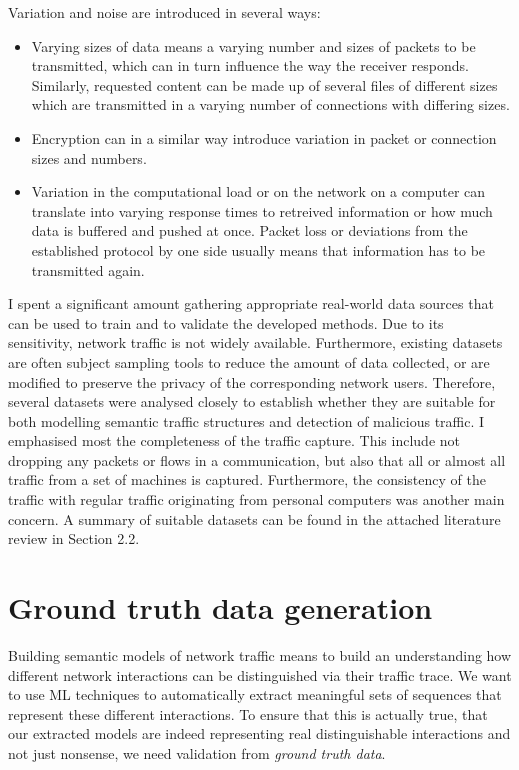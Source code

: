 \documentclass[a4paper,12pt,twoside]{report}
\begin{document}
Variation and noise are introduced in several ways:

\begin{itemize}

\item Varying sizes of data means a varying number and sizes of packets to be transmitted, which can in turn influence the way the receiver responds. Similarly, requested content can be made up of several files of different sizes which are transmitted in a varying number of connections with differing sizes.
\item Encryption can in a similar way introduce variation in packet or connection sizes and numbers.
\item Variation in the computational load or on the network on a computer can translate into varying response times to retreived information or how much data is buffered and pushed at once. Packet loss or deviations from the established protocol by one side usually means that information has to be transmitted again.

\end{itemize}

I spent a significant amount gathering appropriate  real-world data sources that can be used to train and to validate the developed methods. Due to its sensitivity, network traffic is not widely available. Furthermore, existing datasets are often subject sampling tools to reduce the amount of data collected, or are modified to preserve the privacy of the corresponding network users. Therefore, several datasets were analysed closely to establish whether they are suitable for both modelling semantic traffic structures and detection of malicious traffic. I emphasised most the completeness of the traffic capture. This include not dropping any packets or flows in a communication, but also that all or almost all traffic from a set of machines is captured. Furthermore, the consistency of the traffic with regular traffic originating from personal computers was another main concern. A summary of suitable datasets can be found in the attached literature review in Section 2.2. 



\section{Ground truth data generation}\label{Groundtruth}

Building semantic models of network traffic means to build an understanding how different network interactions can be distinguished via their traffic trace. We want to use ML techniques to automatically extract meaningful sets of sequences that represent these different interactions. To ensure that this is actually true, that our extracted models are indeed representing real distinguishable interactions and not just nonsense, we need validation from \textit{ground truth data}. 
\end{document}
